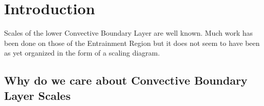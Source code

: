 
\chapter{Introduction}
\label{ch:Introduction}




Scales of the lower Convective Boundary Layer are well known.  Much work has been done on those of the Entrainment Region but it does not seem to have been as yet organized in the form of a scaling diagram.  

\section{Why do we care about Convective Boundary Layer Scales}
\label{sec:WhydowecareaboutConvectiveBoundaryLayerScales}

